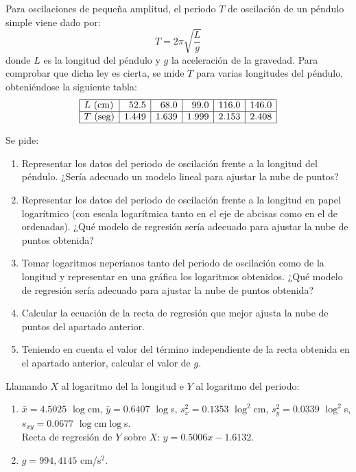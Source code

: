 {Para oscilaciones de pequeña amplitud, el periodo $T$ de oscilación de un péndulo simple viene dado por:
\[
T = 2\pi \sqrt {\frac{L}{g}}
\]
donde $L$ es la longitud del péndulo y $g$ la aceleración de la gravedad.
Para comprobar que dicha ley es cierta, se mide $T$ para varias longitudes del péndulo, obteniéndose la siguiente tabla:
\[
\begin{array}{|l|r|r|r|r|r|}
\hline
L\text{ (cm)} & 52.5 & 68.0 & 99.0 & 116.0 & 146.0 \\
\hline
T\text{ (seg)} & 1.449 & 1.639 & 1.999 & 2.153 & 2.408\\
\hline
\end{array}
\]

Se pide:
\begin{enumerate}
\item Representar los datos del periodo de oscilación frente a la longitud del péndulo.
¿Sería adecuado un modelo lineal para ajustar la nube de puntos?
\item Representar los datos del periodo de oscilación frente a la longitud en papel logarítmico (con escala logarítmica
tanto en el eje de abcisas como en el de ordenadas).
¿Qué modelo de regresión sería adecuado para ajustar la nube de puntos obtenida?
\item Tomar logaritmos neperianos tanto del periodo de oscilación como de la longitud y representar en una gráfica los
logaritmos obtenidos.
¿Qué modelo de regresión sería adecuado para ajustar la nube de puntos obtenida?
\item Calcular la ecuación de la recta de regresión que mejor ajusta la nube de puntos del apartado anterior.
\item Teniendo en cuenta el valor del término independiente de la recta obtenida en el apartado anterior, calcular el
valor de $g$.
\end{enumerate}
}
{Llamando $X$ al logaritmo del la longitud e $Y$ al logaritmo del periodo:
\begin{enumerate}[start=4]
\item $\bar x=4.5025$ $\log$cm, $\bar y=0.6407$ $\log$s, $s_x^2=0.1353$ $\log^2$cm, $s_y^2=0.0339$ $\log^2$s, $s_{xy}=0.0677$ $\log$cm\cdot$\log$s.\\
Recta de regresión de $Y$ sobre $X$: $y=0.5006x-1.6132$.
\item $g=994,4145$ cm/s$^2$.
\end{enumerate}
}
{}


